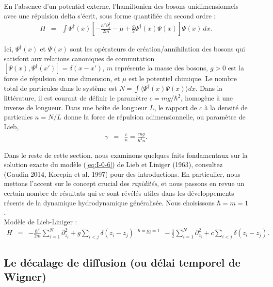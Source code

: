 En l'absence d'un potentiel externe, l'hamiltonien des bosons unidimensionnels avec une répulsion delta s'écrit, sous forme quantifiée du second ordre :
\begin{eqnarray}\label{eq:I-0-6}
	H & =& \int \Psi^\dag(x) \left [ - \frac{\hbar^2 \partial_x^2}{2m} - \mu + \frac{g}{2}\Psi^\dag(x)\Psi(x) \right ] \Psi(x) \, dx.
\end{eqnarray}

Ici, $\Psi^\dag(x)$ et $\Psi(x)$ sont les opérateurs de création/annihilation des bosons qui satisfont aux relations canoniques de commutation $[ \Psi(x) , \Psi^\dag(x')] = \delta ( x - x')$, $m$ représente la masse des bosons, $g > 0$ est la force de répulsion en une dimension, et $\mu$ est le potentiel chimique. Le nombre total de particules dans le système est $N = \int \langle  \Psi^\dag(x)\Psi(x) \rangle dx$. Dans la littérature, il est courant de définir le paramètre $c = mg/\hbar^2$, homogène à une inverse de longueur. Dans une boîte de longueur $L$, le rapport de $c$ à la densité de particules $n = N/L$ donne la force de répulsion adimensionnelle, ou paramètre de Lieb,
\begin{eqnarray}
	\gamma & = & \frac{c}{n} = \frac{mg}{\hbar^2n}.	
\end{eqnarray}

Dans le reste de cette section, nous examinons quelques faits fondamentaux sur la solution exacte du modèle (\ref{eq:I-0-6}) de {\color{blue} Lieb et Liniger} ({\color{blue}1963}), consultez ({\color{blue}Gaudin 2014, Korepin et al. 1997}) pour des introductions. En particulier, nous mettons l'accent sur le concept crucial des {\em rapidités}, et nous passons en revue un certain nombre de résultats qui se sont révélés utiles dans les développements récents de la dynamique hydrodynamique généralisée. Nous choisissons $\hbar  = m = 1$.\\

Modèle de {\sc Lieb-Liniger} :
\begin{eqnarray}
	 H & = & - \frac{\hbar^2 }{2m} \sum_{i = 1}^N \partial_{z_i}^2  + g\sum_{i < j } \delta ( z_i - z_j ) 	~\overset{\hbar  = m = 1}{=}~ - \frac{1 }{2} \sum_{i = 1}^N \partial_{z_i}^2  + c\sum_{i < j } \delta ( z_i - z_j ).
\end{eqnarray}

\subsection{Le décalage de diffusion (ou délai temporel de Wigner)}


